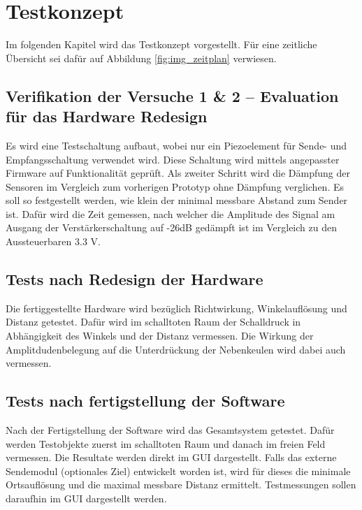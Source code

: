 \documentclass[10pt,a4paper,oneside]{99_fhnwreport}
\begin{document}
\section{Testkonzept}\label{sec:testkonzept}
Im folgenden Kapitel wird das Testkonzept vorgestellt. Für eine zeitliche Übersicht sei dafür auf Abbildung \ref{fig:img_zeitplan} verwiesen.

\subsection*{Verifikation der Versuche 1 \& 2 -- Evaluation für das Hardware Redesign}
Es wird eine Testschaltung aufbaut, wobei nur ein Piezoelement für Sende- und Empfangsschaltung verwendet wird. Diese Schaltung wird mittels angepasster Firmware auf Funktionalität geprüft. Als zweiter Schritt wird die Dämpfung der Sensoren im Vergleich zum vorherigen Prototyp ohne Dämpfung verglichen. Es soll so festgestellt werden, wie klein der minimal messbare Abstand zum Sender ist. Dafür wird die Zeit gemessen, nach welcher die Amplitude des Signal am Ausgang der Verstärkerschaltung auf -26dB gedämpft ist im Vergleich zu den Aussteuerbaren 3.3 V.

\subsection*{Tests nach Redesign der Hardware}
Die fertiggestellte Hardware wird bezüglich Richtwirkung, Winkelauflösung und Distanz getestet. Dafür wird im schalltoten Raum der Schalldruck in Abhängigkeit des Winkels und der Distanz vermessen. Die Wirkung der Amplitdudenbelegung auf die Unterdrückung der Nebenkeulen wird dabei auch vermessen.

\subsection*{Tests nach fertigstellung der Software}
Nach der Fertigstellung der Software wird das Gesamtsystem getestet. Dafür werden Testobjekte zuerst im schalltoten Raum und danach im freien Feld vermessen. Die Resultate werden direkt im GUI dargestellt.
Falls das externe Sendemodul (optionales Ziel) entwickelt worden ist, wird für dieses die minimale Ortsauflösung und die maximal messbare Distanz ermittelt. Testmessungen sollen daraufhin im GUI dargestellt werden.
\end{document}
